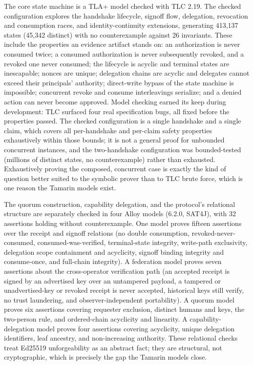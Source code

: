 \documentclass[11pt]{article}
\begin{document}
The core state machine is a TLA+ model checked with TLC 2.19. The checked
configuration explores the handshake lifecycle, signoff flow, delegation,
revocation and consumption races, and identity-continuity extensions, generating
413,137 states (45,342 distinct) with no counterexample against 26 invariants.
These include the properties an evidence artifact stands on: an authorization is
never consumed twice; a consumed authorization is never subsequently revoked, and a
revoked one never consumed; the lifecycle is acyclic and terminal states are
inescapable; nonces are unique; delegation chains are acyclic and delegates cannot
exceed their principals' authority; direct-write bypass of the state machine is
impossible; concurrent revoke and consume interleavings serialize; and a denied
action can never become approved. Model checking earned its keep during
development: TLC surfaced four real specification bugs, all fixed before the
properties passed. The checked configuration is a single handshake and a single
claim, which covers all per-handshake and per-claim safety properties exhaustively
within those bounds; it is not a general proof for unbounded concurrent instances,
and the two-handshake configuration was bounded-tested (millions of distinct
states, no counterexample) rather than exhausted. Exhaustively proving the
composed, concurrent case is exactly the kind of question better suited to the
symbolic prover than to TLC brute force, which is one reason the Tamarin models
exist.

The quorum construction, capability delegation, and the protocol's relational
structure are separately checked in four Alloy models (6.2.0, SAT4J), with
32 assertions holding without counterexample. One model proves fifteen assertions over the
receipt and signoff relations (no double consumption, revoked-never-consumed,
consumed-was-verified, terminal-state integrity, write-path exclusivity, delegation
scope containment and acyclicity, signoff binding integrity and consume-once, and
full-chain integrity). A federation model proves seven assertions about the
cross-operator verification path (an accepted receipt is signed by an advertised
key over an untampered payload, a tampered or unadvertised-key or revoked receipt
is never accepted, historical keys still verify, no trust laundering, and
observer-independent portability). A quorum model proves six assertions covering
requester exclusion, distinct humans and keys, the two-person rule, and ordered-chain
acyclicity and linearity. A capability-delegation model proves four assertions
covering acyclicity, unique delegation identifiers, leaf ancestry, and
non-increasing authority. These relational checks treat Ed25519
unforgeability as an abstract fact; they are structural, not cryptographic, which
is precisely the gap the Tamarin models close.
\end{document}

